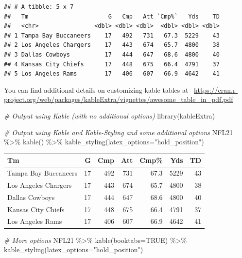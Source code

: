 \documentclass[
  11pt,
]{book}
\newenvironment{Shaded}{\begin{snugshade}}{\end{snugshade}}
\newcommand{\AttributeTok}[1]{\textcolor[rgb]{0.77,0.63,0.00}{#1}}
\newcommand{\CommentTok}[1]{\textcolor[rgb]{0.56,0.35,0.01}{\textit{#1}}}
\newcommand{\ConstantTok}[1]{\textcolor[rgb]{0.00,0.00,0.00}{#1}}
\newcommand{\FunctionTok}[1]{\textcolor[rgb]{0.00,0.00,0.00}{#1}}
\newcommand{\NormalTok}[1]{#1}
\newcommand{\SpecialCharTok}[1]{\textcolor[rgb]{0.00,0.00,0.00}{#1}}
\newcommand{\StringTok}[1]{\textcolor[rgb]{0.31,0.60,0.02}{#1}}
\theoremstyle{definition}
\theoremstyle{definition}
\theoremstyle{definition}
\theoremstyle{definition}
\theoremstyle{remark}
\begin{document}
\begin{verbatim}
## # A tibble: 5 x 7
##   Tm                       G   Cmp   Att `Cmp%`   Yds    TD
##   <chr>                <dbl> <dbl> <dbl>  <dbl> <dbl> <dbl>
## 1 Tampa Bay Buccaneers    17   492   731   67.3  5229    43
## 2 Los Angeles Chargers    17   443   674   65.7  4800    38
## 3 Dallas Cowboys          17   444   647   68.6  4800    40
## 4 Kansas City Chiefs      17   448   675   66.4  4791    37
## 5 Los Angeles Rams        17   406   607   66.9  4642    41
\end{verbatim}

You can find additional details on customizing kable tables at ~\url{https://cran.r-project.org/web/packages/kableExtra/vignettes/awesome_table_in_pdf.pdf}

\begin{Shaded}
\begin{Highlighting}[]
\CommentTok{\# Output using Kable (with no additional options)}
\FunctionTok{library}\NormalTok{(kableExtra)}

\CommentTok{\# Output using Kable and Kable{-}Styling and some additional options}
\NormalTok{NFL21 }\SpecialCharTok{\%\textgreater{}\%} \FunctionTok{kable}\NormalTok{() }\SpecialCharTok{\%\textgreater{}\%} \FunctionTok{kable\_styling}\NormalTok{(}\AttributeTok{latex\_options=}\StringTok{"hold\_position"}\NormalTok{)}
\end{Highlighting}
\end{Shaded}

\begin{table}[!h]
\centering
\begin{tabular}{l|r|r|r|r|r|r}
\hline
Tm & G & Cmp & Att & Cmp\% & Yds & TD\\
\hline
Tampa Bay Buccaneers & 17 & 492 & 731 & 67.3 & 5229 & 43\\
\hline
Los Angeles Chargers & 17 & 443 & 674 & 65.7 & 4800 & 38\\
\hline
Dallas Cowboys & 17 & 444 & 647 & 68.6 & 4800 & 40\\
\hline
Kansas City Chiefs & 17 & 448 & 675 & 66.4 & 4791 & 37\\
\hline
Los Angeles Rams & 17 & 406 & 607 & 66.9 & 4642 & 41\\
\hline
\end{tabular}
\end{table}

\begin{Shaded}
\begin{Highlighting}[]
\CommentTok{\# More options}
\NormalTok{NFL21 }\SpecialCharTok{\%\textgreater{}\%} \FunctionTok{kable}\NormalTok{(}\AttributeTok{booktabs=}\ConstantTok{TRUE}\NormalTok{) }\SpecialCharTok{\%\textgreater{}\%} \FunctionTok{kable\_styling}\NormalTok{(}\AttributeTok{latex\_options=}\StringTok{"hold\_position"}\NormalTok{)}
\end{Highlighting}
\end{Shaded}
\end{document}

